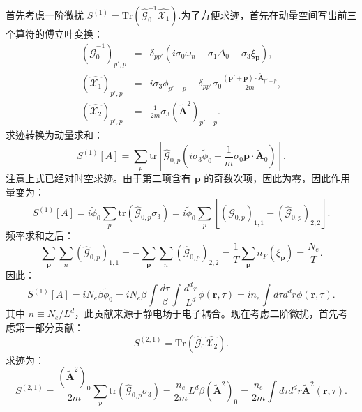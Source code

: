 \documentclass[10pt,UTF8]{ctexart}
\begin{document}
首先考虑一阶微扰 $S^{(1)}=\mathrm{Tr}\left(\hat{\mathcal G}_0^{-1}\hat{\mathcal X_1} \right)$.为了方便求迹，首先在动量空间写出前三个算符的傅立叶变换：
\begin{eqnarray}
	(\hat{\mathcal G}_0^{-1})_{p',p}
	&=& \delta_{pp'} (i\sigma_0\omega_n +\sigma_1 \Delta_0-\sigma_3 \xi_{\bm p}), \\
	(\hat{\mathcal X_1})_{p',p}
	&=& i\sigma_3 \tilde\phi_{p'-p} -\delta_{pp'}\sigma_0\frac{(\bm p' + \bm p)\cdot \tilde{\bm A}_{p'-p}}{2m}, \\
	(\hat{\mathcal X_2})_{p',p}
	&=& \frac{1}{2m} \sigma_3 (\tilde{\bm A}^2)_{p'-p}.
\end{eqnarray}
求迹转换为动量求和：
\begin{equation}
	S^{(1)}[A] = 
	\sum_p \mathrm{tr}\left[\hat{\mathcal G}_{0,p}\left(i\sigma_3\tilde\phi_0 - \frac{1}{m}\sigma_0\bm p\cdot \tilde{\bm A}_0\right)\right].
\end{equation}
注意上式已经对时空求迹。由于第二项含有 $\bm p$ 的奇数次项，因此为零，因此作用量变为：
\begin{equation}
	S^{(1)}[A] = 
	i \tilde\phi_0 \sum_p \mathrm{tr}\left(\hat{\mathcal G}_{0,p}\sigma_3 \right)
	= i \tilde\phi_0 \sum_p \left[ \left(\hat{\mathcal G}_{0,p}\right)_{1,1}- \left(\hat{\mathcal G}_{0,p}\right)_{2,2} \right].
\end{equation}
频率求和之后：
\begin{equation}
	\sum_{\bm p}\sum_n \left(\hat{\mathcal G}_{0,p}\right)_{1,1}
	= - \sum_{\bm p}\sum_n \left(\hat{\mathcal G}_{0,p}\right)_{2,2}
	= \frac{1}{T}\sum_{\bm p}n_F(\xi_{\bm p})
	= \frac{N_e}{T}.
\end{equation}
因此：
\begin{equation}
	S^{(1)}[A] 
	= i N_e \beta \tilde\phi_0
	= i N_e \beta \int \frac{d\tau}{\beta} \int \frac{d^d r}{L^d} \phi(\bm r,\tau)
	= i n_e \int d\tau d^d r \phi(\bm r,\tau).
\end{equation}
其中 $n\equiv N_e/L^d$，此贡献来源于静电场于电子耦合。现在考虑二阶微扰，首先考虑第一部分贡献：
\begin{equation}
	S^{(2,1)} = \mathrm{Tr}\left(\hat{\mathcal G}_0 \hat{\mathcal X_2} \right).
\end{equation}
求迹为：
\begin{equation}
	S^{(2,1)}
	= \frac{(\tilde{\bm A}^2)_0}{2m}\sum_p \mathrm{tr} \left(\hat{\mathcal G}_{0,p}\sigma_3 \right)
	= \frac{n_e}{2m} L^d \beta (\tilde{\bm A}^2)_0
	= \frac{n_e}{2m} \int d\tau d^d r \tilde{\bm A}^2(\bm r,\tau).
\end{equation}
\end{document}
